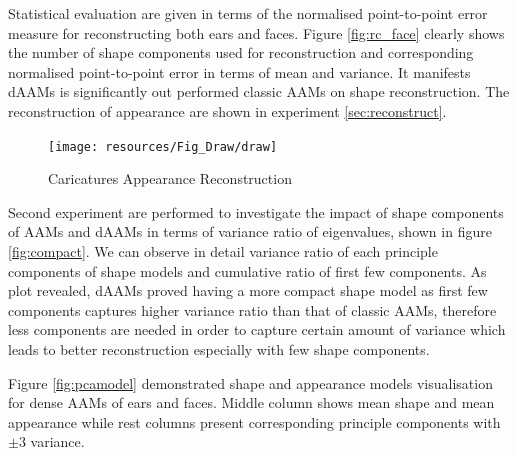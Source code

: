 Statistical evaluation are given in terms of the normalised point-to-point error measure for reconstructing both ears and faces. Figure \ref{fig:rc_face} clearly shows the number of shape components used for reconstruction and corresponding normalised point-to-point error in terms of mean and variance. It manifests dAAMs is significantly out performed classic AAMs on shape reconstruction. The reconstruction of appearance are shown in experiment \ref{sec:reconstruct}.

\begin{figure}[!b]
    \centering
    \texttt{[image: resources/Fig\_Draw/draw]}
    \caption{Caricatures Appearance Reconstruction}
    \label{fig:draw}
\end{figure}

Second experiment are performed to investigate the impact of shape components of AAMs and dAAMs in terms of variance ratio of eigenvalues, shown in figure \ref{fig:compact}. We can observe in detail variance ratio of each principle components of shape models and cumulative ratio of first few components. As plot revealed, dAAMs proved having a more compact shape model as first few components captures higher variance ratio than that of classic AAMs, therefore less components are needed in order to capture certain amount of variance which leads to better reconstruction especially with few shape components.

Figure \ref{fig:pcamodel} demonstrated shape and appearance models visualisation for dense AAMs of ears and faces. Middle column shows mean shape and mean appearance while rest columns present corresponding principle components with $\pm 3$ variance.

